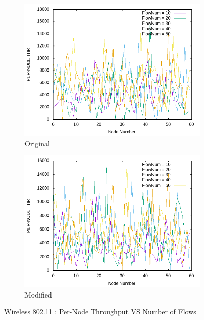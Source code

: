     \begin{figure}[!h] 
    	\centering
    	
    	\begin{subfigure}{0.9\textwidth} %
    		\includegraphics[width=.98\textwidth]{Pictures/Wireless802.11Mobile/Original/PER-NODETHRVSFlowNum.png}
    		 \caption{Original} %
    	\end{subfigure}
    	
    	\vspace{1em} %
    	
    	\begin{subfigure}{0.9\textwidth} %
    		\includegraphics[width=.98\textwidth]{Pictures/Wireless802.11Mobile/Modified/PER-NODETHRVSFlowNum.png}
    		 \caption{ Modified} %
    	\end{subfigure}
    	
    	 \caption{Wireless 802.11 : Per-Node Throughput VS Number of Flows} %
    \end{figure}
    
